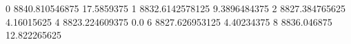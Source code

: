 0 8840.810546875 17.5859375
1 8832.6142578125 9.3896484375
2 8827.384765625 4.16015625
4 8823.224609375 0.0
6 8827.626953125 4.40234375
8 8836.046875 12.822265625
